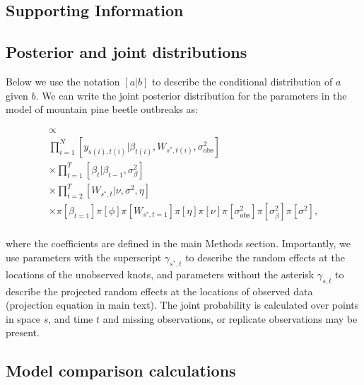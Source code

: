\documentclass[12pt,english]{article}
\begin{document}
\begin{spacing}{1.2}

\clearpage

\section{Supporting Information}

\subsection{Posterior and joint distributions}
Below we use the notation $[a|b]$ to describe the conditional distribution of
$a$ given $b$. We can write the joint posterior distribution for the parameters
in the model of mountain pine beetle outbreaks as:

\begin{multline}
  [\bm{W},
  \bm{\beta},
  \phi,
  \eta,
  \nu,
  \sigma^2_{\mathrm{obs}},
  \sigma^2_{\beta},
  \sigma^2
  |
  \bm{y}]
  \propto \\
  \prod_{i=1}^{N}
  [y_{s(i),t(i)} | \beta_{t(i)}, W_{s^{*},t(i)}, \sigma^2_{\mathrm{obs}}] \\
  \times \prod_{t=1}^{T}[\beta_t | \beta_{t-1}, \sigma^2_{\beta}] \\
  \times \prod_{t=2}^{T}[W_{s^{*},t} | \nu, \sigma^2, \eta] \\
  \times
  \pi[\beta_{t=1}]
  \pi[\phi]
  \pi[W_{s^{*},t=1}]
  \pi[\eta]
  \pi[\nu]
  \pi[\sigma^2_{\mathrm{obs}}]
  \pi[\sigma^2_{\beta}]
  \pi[\sigma^2],
  \\
\end{multline}

\noindent where the coefficients are defined in the main Methods section. Importantly,
we use parameters with the superscript $\gamma_{s^{*},t}$ to describe the random effects at the
locations of the unobserved knots, and parameters without the asterisk $\gamma_{s,t}$ to describe the
projected random effects at the locations of observed data (projection equation in main text). The
joint probability is calculated over points in space $s$, and time $t$ and missing observations,
or replicate observations may be present.

\subsection{Model comparison calculations}


\end{spacing}
\end{document}
